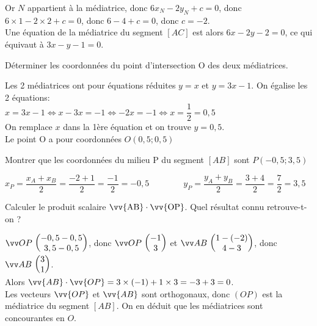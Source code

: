 \documentclass[12pt,a4paper]{article}  %
\begin{document}
\begin{enumMet}
\begin{corrBox}
    	Or $N$ appartient à la médiatrice, donc $6x_{N}-2y_{N}+c=0$, donc $6\times 1-2\times2+c=0$, donc $6-4+c=0$, donc $c=-2$.\\
    	Une équation de la médiatrice du segment $[AC]$ est alors $6x-2y-2=0$, ce qui équivaut à $3x-y-1=0$.
    \end{corrBox}
    \item Déterminer les coordonnées du point d'intersection $\mathrm{O}$ des deux médiatrices.\\
    \begin{corrBox}
    	Les 2 médiatrices ont pour équations réduites $y=x$ et $y=3x-1$. On égalise les 2 équations:\\
    	$x=3x-1\iff x-3x=-1\iff -2x=-1\iff x=\dfrac{1}{2}=0,5$\\
    	On remplace $x$ dans la 1ère équation et on trouve $y=0,5$.\\
    	Le point O a pour coordonnées $O(0,5;0,5)$
    \end{corrBox}
    \item {} Montrer que les coordonnées du milieu P du segment $[AB]$ sont $P(-0,5;3,5)$\\
    \begin{corrBox}
    	$x_P=\dfrac{x_A+x_B}{2}=\dfrac{-2+1}{2}=\dfrac{-1}{2}=-0,5\quad \quad \quad \quad y_P=\dfrac{y_A+y_B}{2}=\dfrac{3+4}{2}=\dfrac{7}{2}=3,5$
    \end{corrBox}
    \item Calculer le produit scalaire $\vv{\mathrm{AB}} \cdot \vv{\mathrm{OP}}$. Quel résultat connu retrouve-t-on ?\\
    \begin{corrBox}
    	$\Coord{OP}{-0,5-0,5}{3,5-0,5}$, donc $\Coord{OP}{-1}{3}$ et $\Coord{AB}{1-(-2)}{4-3}$, donc $\Coord{AB}{3}{1}$.\\
    	Alors $\vv{A B} \cdot \vv{OP}=3 \times (-1)+1 \times3=-3+3=0$.\\
    	Les vecteurs $\vv{OP}$ et $\vv{AB}$ sont orthogonaux, donc $(OP)$ est la médiatrice du segment $[AB]$. On en déduit que les médiatrices sont concourantes en $O$.
    \end{corrBox}
\end{enumMet}
\end{document}
